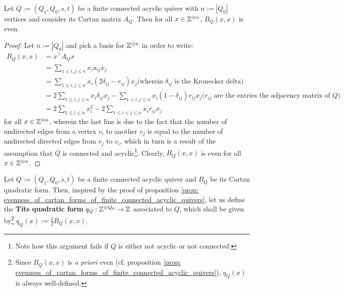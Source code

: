             \begin{proposition} \label{prop: evenness_of_cartan_forms_of_finite_connected_acyclic_quivers}
                Let $Q := (Q_1, Q_0, s, t)$ be a finite connected acyclic quiver with $n := |Q_0|$ vertices and consider its Cartan matrix $A_Q$. Then for all $x \in \mathbb{Z}^{\oplus n}$, $B_Q(x, x)$ is even.  
            \end{proposition}
                \begin{proof}
                    Let $n := |Q_0|$ and pick a basis for $\mathbb{Z}^{\oplus n}$ in order to write:
                        $$
                            \begin{aligned}
                                B_Q(x, x) & = x^{\top} A_Q x
                                \\
                                & = \sum_{1 \leq i, j \leq n} x_i a_{ij} x_j
                                \\
                                & = \sum_{1 \leq i, j \leq n} x_i (2\delta_{ij} - r_{ij}) x_j \text{(wherein $\delta_{ij}$ is the Kronecker delta)}
                                \\
                                & = 2\sum_{1 \leq i, j \leq n} x_i \delta_{ij} x_j - \sum_{1 \leq i, j \leq n} x_i (1 - \delta_{ij}) r_{ij} x_j \text{($r_{ij}$ are the entries the adjacency matrix of $Q$)}
                                \\
                                & = 2\sum_{1 \leq i \leq n} x_i^2 - 2\sum_{1 \leq i < j \leq n} x_i r_{ij} x_j
                            \end{aligned}
                        $$
                    for all $x \in \mathbb{Z}^{\oplus n}$, wherein the last line is due to the fact that the number of undirected edges from a vertex $v_i$ to another $v_j$ is equal to the number of undirected directed edges from $v_j$ to $v_i$, which in turn is a result of the assumption that $Q$ is connected and acyclic\footnote{Note how this argument fails if $Q$ is either not acyclic or not connected.}. Clearly, $B_Q(x, x)$ is even for all $x \in \mathbb{Z}^{\oplus n}$.
                \end{proof}
            \begin{definition} \label{def: tits_quadratic_forms}
                Let $Q := (Q_1, Q_0, s, t)$ be a finite connected acyclic quiver and $B_Q$ be its Cartan quadratic form. Then, inspired by the proof of proposition \ref{prop: evenness_of_cartan_forms_of_finite_connected_acyclic_quivers}, let us define the \textbf{Tits quadratic form} $q_Q: \mathbb{Z}^{\oplus Q_0} \to \mathbb{Z}$ associated to $Q$, which shall be given by\footnote{Since $B_Q(x, x)$ is \textit{a priori} even (cf. proposition \ref{prop: evenness_of_cartan_forms_of_finite_connected_acyclic_quivers}), $q_Q(x)$ is always well-defined.} $q_Q(x) := \frac12 B_Q(x, x)$. 
            \end{definition}

